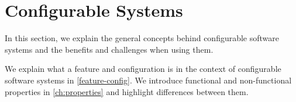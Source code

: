 \section{Configurable Systems}\label{ch:configurable-systems}
\theoremstyle{definition}
\newtheorem{definition}{Definition}[section]

In this section, we explain the general concepts behind configurable software systems and the benefits and challenges when using them. 

We explain what a feature and configuration is in the context of configurable software systems in \autoref{feature-config}. 
We introduce functional and non-functional properties in \autoref{ch:properties} and highlight differences between them.



